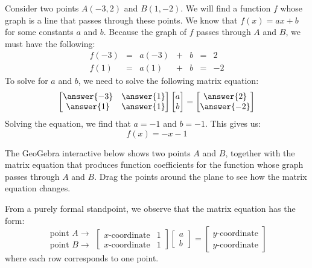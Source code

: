 \documentclass{ximera}
\begin{document}
\begin{exploration}\label{exp:curveFitLine}
Consider two points $A(-3, 2)$ and $B(1,-2)$.  We will find a function $f$ whose graph is a line that passes through these points.  We know that $f(x)=ax+b$ for some constants $a$ and $b$.  Because the graph of $f$ passes through $A$ and $B$, we must have the following:
$$\begin{matrix}
      f(-3)&=&a(-3)&+&b&=&2\\
      f(1)&=&a(1)&+&b&=&-2
    \end{matrix}$$
To solve for $a$ and $b$, we need to solve the following matrix equation:
$$\begin{bmatrix}\answer{-3} & \answer{1}\\\answer{1} & \answer{1}\end{bmatrix}\begin{bmatrix}a\\b\end{bmatrix}=\begin{bmatrix}\answer{2}\\\answer{-2}\end{bmatrix}$$
Solving the equation, we find that $a=-1$ and $b=-1$.  This gives us:
$$f(x)=-x-1$$

The GeoGebra interactive below shows two points $A$ and $B$, together with the matrix equation that produces function coefficients for the function whose graph passes through $A$ and $B$.  Drag the points around the plane to see how the matrix equation changes.



\begin{onlineOnly}
\begin{center}
\end{center}
\end{onlineOnly}

From a purely formal standpoint, we observe that the matrix equation has the form:
$$\begin{matrix}\text{point }A\rightarrow\\\text{point }B\rightarrow\end{matrix}\begin{bmatrix}x\text{-coordinate} & 1\\x\text{-coordinate} & 1\end{bmatrix}\begin{bmatrix}a\\b\end{bmatrix}=\begin{bmatrix}y\text{-coordinate}\\y\text{-coordinate}\end{bmatrix}$$
where each row corresponds to one point.
\end{exploration}
\end{document}
